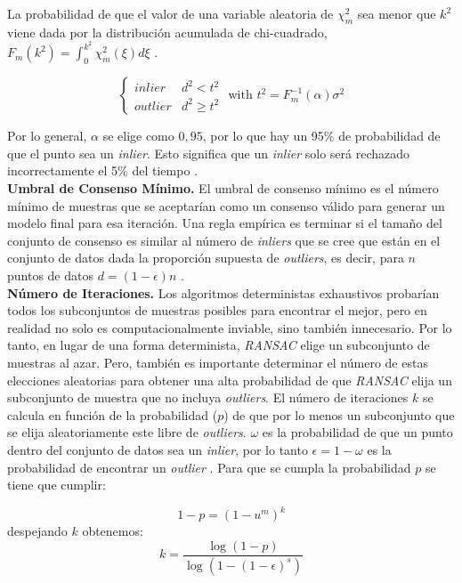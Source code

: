 La probabilidad de que el valor de una variable aleatoria de $\chi_{m}^2$ sea menor que $k^2$ viene dada por la distribución acumulada de chi-cuadrado, $F_m(k^2) = \int_{0}^{k^2} \chi_{m}^2(\xi)d\xi$ \cite{RichardAndrew}.

$$
\left\{
\begin{array}{ll}
	inlier & d^2 < t^2\\
	outlier & d^2 \geq t^2
\end{array}
\right.
\mbox{ with } t^2 = F_{m}^{-1}(\alpha)\sigma^2
$$

Por lo general, $\alpha$ se elige como $0,95$, por lo que hay un 95\% de probabilidad de que el punto sea un \textit{inlier}. Esto significa que un \textit{inlier} solo será rechazado incorrectamente el 5\% del tiempo \cite{RichardAndrew}.\\

\textbf{Umbral de Consenso Mínimo.}
El umbral de consenso mínimo es el número mínimo de muestras que se aceptarían como un consenso válido para generar un modelo final para esa iteración. Una regla empírica es terminar si el tamaño del conjunto de consenso es similar al número de \textit{inliers} que se cree que están en el conjunto de datos dada la proporción supuesta de \textit{outliers}, es decir, para $n$ puntos de datos $d = (1 - \epsilon)n$ \cite{RichardAndrew}.\\

\textbf{Número de Iteraciones.}
Los algoritmos deterministas exhaustivos probarían todos los subconjuntos de muestras posibles para encontrar el mejor, pero en realidad no solo es computacionalmente inviable, sino también innecesario. Por lo tanto, en lugar de una forma determinista, \textit{RANSAC} elige un subconjunto de muestras al azar. Pero, también es importante determinar el número de estas elecciones aleatorias para obtener una alta probabilidad de que \textit{RANSAC} elija un subconjunto de muestra que no incluya \textit{outliers}.
El número de iteraciones $k$ se calcula en función de la probabilidad ($p$) de que por lo menos un subconjunto que se elija aleatoriamente este libre de \textit{outliers}. $\omega$ es la probabilidad de que un punto dentro del conjunto de datos sea un \textit{inlier}, por lo tanto $\epsilon = 1-\omega$ es la probabilidad de encontrar un \textit{outlier} \cite{PabloJuan}. Para que se cumpla la probabilidad $p$ se tiene que cumplir:

$$1 - p = (1 - u^m)^k$$
despejando $k$ obtenemos:
$$k = \frac{\log(1 - p)}{\log(1 - (1 - \epsilon)^s)}$$
